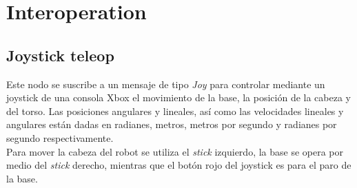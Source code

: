 \documentclass[user_manual.tex]{subfiles}
\begin{document}
\section{Interoperation}

\subsection{Joystick teleop}
Este nodo se suscribe a un mensaje de tipo \textit{Joy} para controlar mediante un joystick de una consola Xbox el movimiento de la base, la posición de la cabeza y del torso. Las posiciones angulares y lineales, así como las velocidades lineales y angulares están dadas en radianes, metros, metros por segundo y radianes por segundo respectivamente.\\

Para mover la cabeza del robot se utiliza el \textit{stick} izquierdo, la base se opera por medio del \textit{stick} derecho, mientras que el botón rojo del joystick es para el paro de la base.\\
\end{document}
